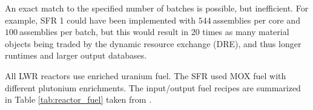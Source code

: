 \documentclass[12pt]{article}
\begin{document}
An exact match to the specified number of batches is possible, but
inefficient.  For example, SFR 1 could have been implemented with
$544~$assemblies per core and $100~$assemblies per batch, but this would
result in 20 times as many material objects being traded by the dynamic
resource exchange (DRE), and thus longer runtimes and larger output databases.


%


All LWR reactors use enriched uranium fuel. The SFR used MOX fuel with
different plutonium enrichments. The input/output fuel recipes are summarized
in Table \ref{tab:reactor_fuel} taken from \cite{B.Feng_calculation}.
\end{document}
